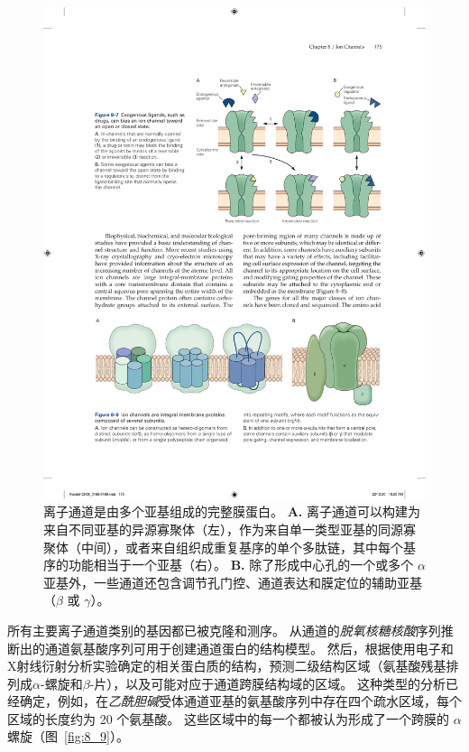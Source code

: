 \begin{figure}[htbp]
	\centering
	\includegraphics[width=1.0\linewidth]{chap08/fig_8_8}
	\caption{离子通道是由多个亚基组成的完整膜蛋白。
		\textbf{A.} 离子通道可以构建为来自不同亚基的异源寡聚体（左），作为来自单一类型亚基的同源寡聚体（中间），或者来自组织成重复基序的单个多肽链，其中每个基序的功能相当于一个亚基（右）。
		\textbf{B.} 除了形成中心孔的一个或多个 $\alpha$ 亚基外，一些通道还包含调节孔门控、通道表达和膜定位的辅助亚基（$\beta$ 或 $\gamma$）。}
	\label{fig:8_8}
\end{figure}


所有主要离子通道类别的基因都已被克隆和测序。
从通道的\textit{脱氧核糖核酸}序列推断出的通道氨基酸序列可用于创建通道蛋白的结构模型。
然后，根据使用电子和X射线衍射分析实验确定的相关蛋白质的结构，预测二级结构区域（氨基酸残基排列成$\alpha$-螺旋和$\beta$-片），以及可能对应于通道跨膜结构域的区域。
这种类型的分析已经确定，例如，在\textit{乙酰胆碱}受体通道亚基的氨基酸序列中存在四个疏水区域，每个区域的长度约为 20 个氨基酸。
这些区域中的每一个都被认为形成了一个跨膜的 $\alpha$ 螺旋（图~\ref{fig:8_9}）。


